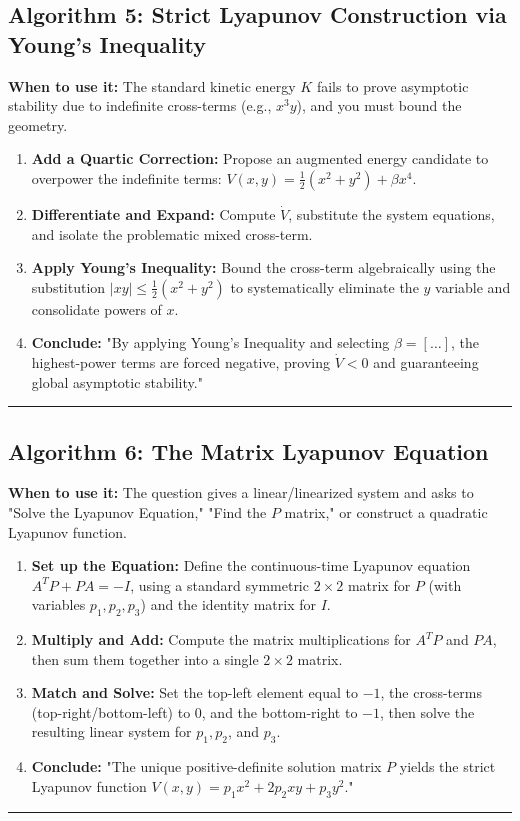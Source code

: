 \documentclass[11pt, a4paper]{report}
\begin{document}
\subsection*{Algorithm 5: Strict Lyapunov Construction via Young's Inequality}
\textbf{When to use it:} The standard kinetic energy $K$ fails to prove asymptotic stability due to indefinite cross-terms (e.g., $x^3y$), and you must bound the geometry.
\begin{enumerate}[label=\textbf{\arabic*.}]
    \item \textbf{Add a Quartic Correction:} Propose an augmented energy candidate to overpower the indefinite terms: $V(x,y) = \frac{1}{2}(x^2 + y^2) + \beta x^4$.
    \item \textbf{Differentiate and Expand:} Compute $\dot{V}$, substitute the system equations, and isolate the problematic mixed cross-term.
    \item \textbf{Apply Young's Inequality:} Bound the cross-term algebraically using the substitution $|xy| \le \frac{1}{2}(x^2 + y^2)$ to systematically eliminate the $y$ variable and consolidate powers of $x$.
    \item \textbf{Conclude:} "By applying Young's Inequality and selecting $\beta = [\dots]$, the highest-power terms are forced negative, proving $\dot{V} < 0$ and guaranteeing global asymptotic stability."
\end{enumerate}
\vspace{1em}
\noindent\rule{\textwidth}{0.4pt}
\vspace{1em}

\subsection*{Algorithm 6: The Matrix Lyapunov Equation}
\textbf{When to use it:} The question gives a linear/linearized system and asks to "Solve the Lyapunov Equation," "Find the $P$ matrix," or construct a quadratic Lyapunov function.
\begin{enumerate}[label=\textbf{\arabic*.}]
    \item \textbf{Set up the Equation:} Define the continuous-time Lyapunov equation $A^T P + PA = -I$, using a standard symmetric $2 \times 2$ matrix for $P$ (with variables $p_1, p_2, p_3$) and the identity matrix for $I$.
    \item \textbf{Multiply and Add:} Compute the matrix multiplications for $A^T P$ and $P A$, then sum them together into a single $2 \times 2$ matrix.
    \item \textbf{Match and Solve:} Set the top-left element equal to $-1$, the cross-terms (top-right/bottom-left) to $0$, and the bottom-right to $-1$, then solve the resulting linear system for $p_1, p_2$, and $p_3$.
    \item \textbf{Conclude:} "The unique positive-definite solution matrix $P$ yields the strict Lyapunov function $V(x,y) = p_1 x^2 + 2p_2 xy + p_3 y^2$."
\end{enumerate}
\vspace{1em}
\noindent\rule{\textwidth}{0.4pt}
\vspace{1em}
\end{document}
